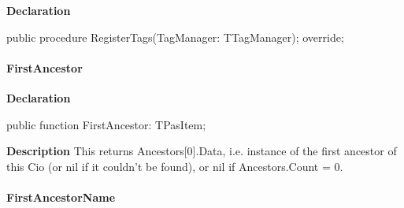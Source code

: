 \documentclass{report}
\newif\ifpdf
\begin{document}
\label{PasDoc_Items.TPasCio-RegisterTags}
\begin{list}{}{
\setlength{\itemindent}{0cm}
\setlength{\listparindent}{0cm}
\setlength{\leftmargin}{\evensidemargin}
\addtolength{\leftmargin}{\tmplength}
\settowidth{\labelsep}{X}
\addtolength{\leftmargin}{\labelsep}
\setlength{\labelwidth}{\tmplength}
}
\item[\textbf{Declaration}\hfill]
\ifpdf
\begin{flushleft}
\fi
\begin{ttfamily}
public procedure RegisterTags(TagManager: TTagManager); override;\end{ttfamily}

\ifpdf
\end{flushleft}
\fi

\end{list}
\paragraph*{FirstAncestor}\hspace*{\fill}

\label{PasDoc_Items.TPasCio-FirstAncestor}
\begin{list}{}{
\setlength{\itemindent}{0cm}
\setlength{\listparindent}{0cm}
\setlength{\leftmargin}{\evensidemargin}
\addtolength{\leftmargin}{\tmplength}
\settowidth{\labelsep}{X}
\addtolength{\leftmargin}{\labelsep}
\setlength{\labelwidth}{\tmplength}
}
\item[\textbf{Declaration}\hfill]
\ifpdf
\begin{flushleft}
\fi
\begin{ttfamily}
public function FirstAncestor: TPasItem;\end{ttfamily}

\ifpdf
\end{flushleft}
\fi

\par
\item[\textbf{Description}]
This returns Ancestors[0].Data, i.e. instance of the first ancestor of this Cio (or nil if it couldn't be found), or nil if Ancestors.Count = 0.

\end{list}
\paragraph*{FirstAncestorName}\hspace*{\fill}
\end{document}
